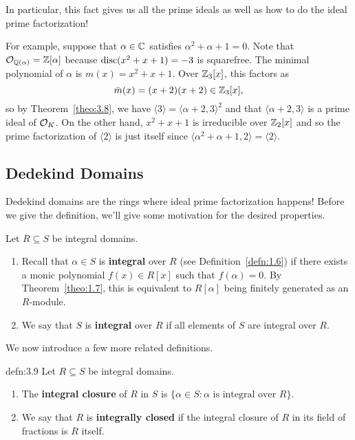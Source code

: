 In particular, this fact gives us all the prime ideals as well as how 
to do the ideal prime factorization! 

For example, suppose that $\alpha \in \mathbb{C}$ satisfies $\alpha^2 + \alpha + 1 = 0$. 
Note that ${\cal O}_{\mathbb{Q}(\alpha)} = \mathbb{Z}[\alpha]$ because 
$\operatorname{disc}(x^2 + x + 1) = -3$ is squarefree. The minimal 
polynomial of $\alpha$ is $m(x) = x^2 + x + 1$. Over $\mathbb{Z}_3[x]$, this factors as 
\[ \bar{m}(x) = (x+2)(x+2) \in \mathbb{Z}_3[x], \] 
so by Theorem~\ref{theo:3.8}, we have $\langle 3 \rangle = \langle \alpha + 2, 3 \rangle^2$ 
and that $\langle \alpha + 2, 3 \rangle$ is a prime ideal of ${\cal O}_K$. 
On the other hand, $x^2 + x + 1$ is irreducible over $\mathbb{Z}_2[x]$ and so 
the prime factorization of $\langle 2 \rangle$ is just itself since 
$\langle \alpha^2 + \alpha + 1, 2 \rangle = \langle 2 \rangle$.

\subsection{Dedekind Domains} \label{subsec:3.3}
Dedekind domains are the rings where ideal prime factorization happens! 
Before we give the definition, we'll give some motivation for the 
desired properties.

Let $R \subseteq S$ be integral domains. 
\begin{enumerate}[(1)]
    \item Recall that $\alpha \in S$ is {\bf integral} over $R$ 
    (see Definition~\ref{defn:1.6}) if there exists a monic polynomial 
    $f(x) \in R[x]$ such that $f(\alpha) = 0$. By Theorem~\ref{theo:1.7},
    this is equivalent to $R[\alpha]$ being finitely generated as an $R$-module.
    \item We say that $S$ is {\bf integral} over $R$ if all elements of 
    $S$ are integral over $R$. 
\end{enumerate}

We now introduce a few more related definitions.

\begin{defn}{defn:3.9}
    Let $R \subseteq S$ be integral domains. 
    \begin{enumerate}[(1)]
        \item The {\bf integral closure} of $R$ in $S$ is 
        $\{\alpha \in S : \alpha \text{ is integral over } R\}$.
        \item We say that $R$ is {\bf integrally closed} if the integral 
        closure of $R$ in its field of fractions is $R$ itself. 
    \end{enumerate}
\end{defn}\vspace{-0.25cm}

